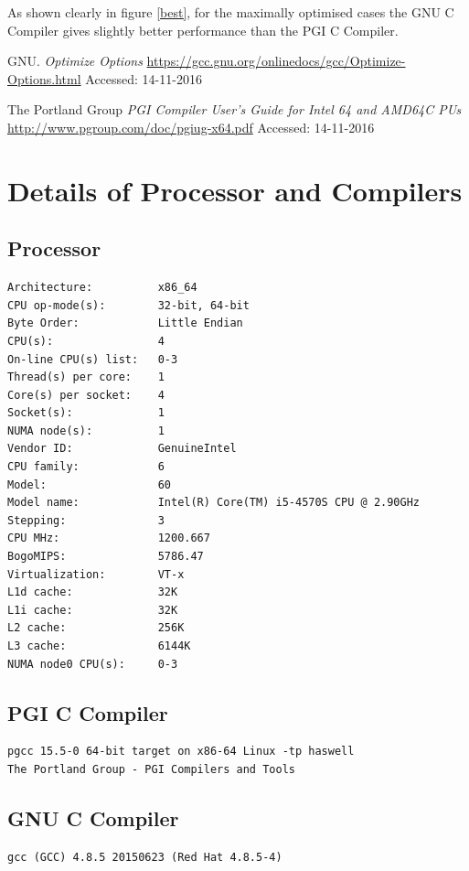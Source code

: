 \documentclass[a4paper,12pt]{article}
\begin{document}
As shown clearly in figure \ref{best}, for the maximally optimised cases the GNU C Compiler gives slightly better performance than the PGI C Compiler.


\begin{thebibliography}{}

GNU.
\textit{Optimize Options}
\url{https://gcc.gnu.org/onlinedocs/gcc/Optimize-Options.html}
Accessed: 14-11-2016

The Portland Group
\textit{PGI Compiler User's Guide for Intel 64 and AMD64C PUs}
\url{http://www.pgroup.com/doc/pgiug-x64.pdf}
Accessed: 14-11-2016

\end{thebibliography}

\pagebreak
\pagebreak
\appendix
\section{Details of Processor and Compilers}
\subsection{Processor}
\begin{verbatim}
Architecture:          x86_64
CPU op-mode(s):        32-bit, 64-bit
Byte Order:            Little Endian
CPU(s):                4
On-line CPU(s) list:   0-3
Thread(s) per core:    1
Core(s) per socket:    4
Socket(s):             1
NUMA node(s):          1
Vendor ID:             GenuineIntel
CPU family:            6
Model:                 60
Model name:            Intel(R) Core(TM) i5-4570S CPU @ 2.90GHz
Stepping:              3
CPU MHz:               1200.667
BogoMIPS:              5786.47
Virtualization:        VT-x
L1d cache:             32K
L1i cache:             32K
L2 cache:              256K
L3 cache:              6144K
NUMA node0 CPU(s):     0-3
\end{verbatim}
\subsection{PGI C Compiler}
\begin{verbatim}
pgcc 15.5-0 64-bit target on x86-64 Linux -tp haswell 
The Portland Group - PGI Compilers and Tools
\end{verbatim}
\subsection{GNU C Compiler}
\begin{verbatim}
gcc (GCC) 4.8.5 20150623 (Red Hat 4.8.5-4)
\end{verbatim}
\end{document}
